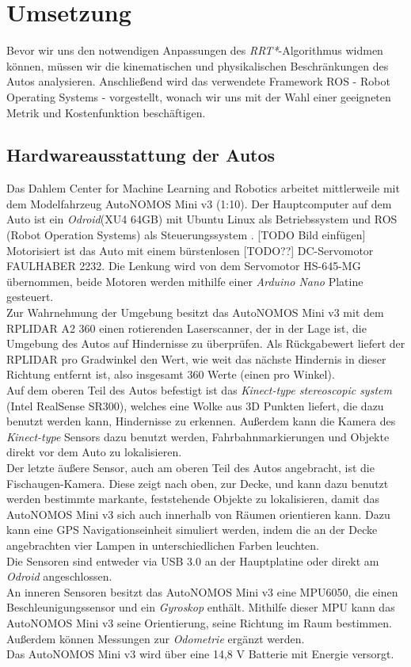 \section{Umsetzung}
\label{Umsetzung}
Bevor wir uns den notwendigen Anpassungen des \textit{RRT*}-Algorithmus widmen können, müssen wir die kinematischen und physikalischen Beschränkungen des Autos analysieren. Anschließend wird das verwendete Framework ROS - Robot Operating Systems - vorgestellt, wonach wir uns mit der Wahl einer geeigneten Metrik und Kostenfunktion beschäftigen.
\subsection{Hardwareausstattung der Autos}
Das Dahlem Center for Machine Learning and Robotics arbeitet mittlerweile mit dem Modelfahrzeug AutoNOMOS Mini v3 (1:10). Der Hauptcomputer auf dem Auto ist ein \textit{Odroid}(XU4 64GB) mit Ubuntu Linux als Betriebssystem und ROS (Robot Operation Systems) als Steuerungssystem \citep{fubAuto}. [TODO Bild einfügen] \\
Motorisiert ist das Auto mit einem bürstenlosen [TODO??] DC-Servomotor FAULHABER 2232. Die Lenkung wird von dem Servomotor HS-645-MG übernommen, beide Motoren werden mithilfe einer \textit{Arduino Nano} Platine gesteuert. \\
Zur Wahrnehmung der Umgebung besitzt das AutoNOMOS Mini v3 mit dem RPLIDAR A2 360 einen rotierenden Laserscanner, der in der Lage ist, die Umgebung des Autos auf Hindernisse zu überprüfen. Als Rückgabewert liefert der RPLIDAR pro Gradwinkel den Wert, wie weit das nächste Hindernis in dieser Richtung entfernt ist, also insgesamt 360 Werte (einen pro Winkel). \\
Auf dem oberen Teil des Autos befestigt ist das \textit{Kinect-type stereoscopic system} (Intel RealSense SR300), welches eine Wolke aus 3D Punkten liefert, die dazu benutzt werden kann, Hindernisse zu erkennen. Außerdem kann die Kamera des \textit{Kinect-type} Sensors dazu benutzt werden, Fahrbahnmarkierungen und Objekte direkt vor dem Auto zu lokalisieren.\\
Der letzte äußere Sensor, auch am oberen Teil des Autos angebracht, ist die Fischaugen-Kamera. Diese zeigt nach oben, zur Decke, und kann dazu benutzt werden bestimmte markante, feststehende Objekte zu lokalisieren, damit das AutoNOMOS Mini v3 sich auch innerhalb von Räumen orientieren kann. Dazu kann eine GPS Navigationseinheit simuliert werden, indem die an der Decke angebrachten vier Lampen in unterschiedlichen Farben leuchten. \\
Die Sensoren sind entweder via USB 3.0 an der Hauptplatine oder direkt am \textit{Odroid} angeschlossen. \\
An inneren Sensoren besitzt das AutoNOMOS Mini v3 eine MPU6050, die einen Beschleunigungssensor und ein \textit{Gyroskop} enthält. Mithilfe dieser MPU kann das AutoNOMOS Mini v3 seine Orientierung, seine Richtung im Raum bestimmen. Außerdem können Messungen zur \textit{Odometrie} ergänzt werden.\\
Das AutoNOMOS Mini v3 wird über eine 14,8 V Batterie mit Energie versorgt.

